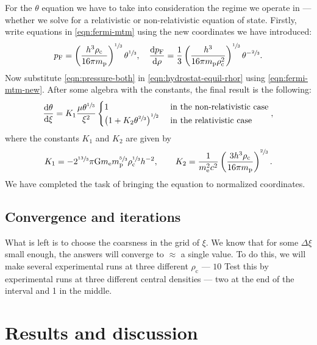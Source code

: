 \documentclass[]{article}
\newcommand{\dd}{\mathop{}\!\mathrm{d}}
\newcommand{\rhoCentre}{\rho_\mathrm{c}}
\newcommand{\fermiMtm}{p_\mathrm{F}}
\newcommand{\massElectron}{m_\mathrm{e}}
\newcommand{\massProton}{m_\mathrm{p}}
\newcommand{\gravconst}{\mathrm{G}}
\begin{document}
	For the $\theta$ equation we have to take into consideration the regime we operate in --- whether we solve for a relativistic or non-relativistic equation of state. Firstly, write equations in \eqref{eqn:fermi-mtm} using the new coordinates we have introduced:
	\begin{equation}\label{eqn:fermi-mtm-new}
		\fermiMtm = \left( \frac{h^3 \rhoCentre}{16 \pi \massProton}\right)^{\sfrac{1}{3}} \theta^{\sfrac{1}{3}} , \quad \frac{\dd \fermiMtm}{\dd \rho} = \frac{1}{3} \left( \frac{h^3}{16 \pi \massProton \rhoCentre^2}\right)^{\sfrac{1}{3}} \theta^{-\sfrac{2}{3}}.
	\end{equation}
	Now substitute \eqref{eqn:pressure-both} in \eqref{eqn:hydrostat-equil-rhor} using \eqref{eqn:fermi-mtm-new}. After some algebra with the constants, the final result is the following:
	\begin{equation}
		\frac{\dd \theta}{\dd \xi} = K_1 \frac{\mu \theta^{\sfrac{1}{3}}}{\xi^2} \begin{cases}
			1 & \text{ in the non-relativistic case}\\
			\left(1 + K_2 \theta^{\sfrac{2}{3}}\right)^{\sfrac{1}{2}} & \text{ in the relativistic case}
		\end{cases},
	\end{equation}
	where the constants $K_1$ and $K_2$ are given by
	\begin{equation}
		K_1 = - 2^{\sfrac{13}{3}} \pi \gravconst \massElectron \massProton^{\sfrac{5}{3}} \rhoCentre^{\sfrac{1}{3}} h^{-2} , \quad \quad K_2 = \frac{1}{\massElectron^2 c^2} \left( \frac{3h^3 \rhoCentre}{16 \pi \massProton} \right)^{\sfrac{2}{3}}.
	\end{equation}
	We have completed the task of bringing the equation to normalized coordinates. 

\subsection{Convergence and iterations}\label{subsec:convergence}
	What is left is to choose the coarsness in the grid of $\xi$. We know that for some $\Delta \xi$ small enough, the answers will converge to $\approx$ a single value. To do this, we will make several experimental runs at three different $\rhoCentre$ --- $10$ Test this by experimental runs at three different central densities --- two at the end of the interval and 1 in the middle.

\section{Results and discussion}\label{sec:results-and-discussion}
\end{document}
